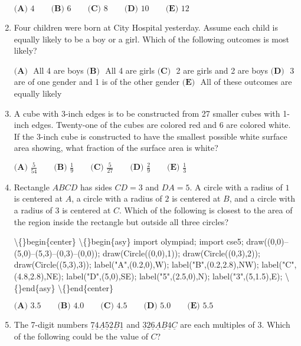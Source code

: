 \documentclass{article}
\begin{document}
\begin{enumerate}[label=\arabic*., itemsep=0.5em]
\( \textbf{(A) }4\qquad\textbf{(B) }6\qquad\textbf{(C) }8\qquad\textbf{(D) }10\qquad\textbf{(E) }12 \)\par \vspace{0.5em}\item Four children were born at City Hospital yesterday. Assume each child is equally likely to be a boy or a girl. Which of the following outcomes is most likely?

\(\textbf{(A) } \) All 4 are boys   \(\textbf{(B) } \) All 4 are girls    \(\textbf{(C) } \) 2 are girls and 2 are boys
\(\textbf{(D) } \) 3 are of one gender and 1 is of the other gender     \(\textbf{(E) } \) All of these outcomes are equally likely\par \vspace{0.5em}\item A cube with 3-inch edges is to be constructed from 27 smaller cubes with 1-inch edges. Twenty-one of the cubes are colored red and 6 are colored white. If the 3-inch cube is constructed to have the smallest possible white surface area showing, what fraction of the surface area is white?

\( \textbf{(A) }\frac{5}{54}\qquad\textbf{(B) }\frac{1}{9}\qquad\textbf{(C) }\frac{5}{27}\qquad\textbf{(D) }\frac{2}{9}\qquad\textbf{(E) }\frac{1}{3} \)\par \vspace{0.5em}\item Rectangle \(ABCD\) has sides \(CD=3\) and \(DA=5\). A circle with a radius of \(1\) is centered at \(A\), a circle with a radius of \(2\) is centered at \(B\), and a circle with a radius of \(3\) is centered at \(C\). Which of the following is closest to the area of the region inside the rectangle but outside all three circles?

\textbackslash\{\}begin\{center\}
\textbackslash\{\}begin\{asy\}
import olympiad;
import cse5;
draw((0,0)--(5,0)--(5,3)--(0,3)--(0,0));
draw(Circle((0,0),1));
draw(Circle((0,3),2));
draw(Circle((5,3),3));
label("A",(0.2,0),W);
label("B",(0.2,2.8),NW);
label("C",(4.8,2.8),NE);
label("D",(5,0),SE);
label("5",(2.5,0),N);
label("3",(5,1.5),E);
\textbackslash\{\}end\{asy\}
\textbackslash\{\}end\{center\}


\( \textbf{(A) }3.5\qquad\textbf{(B) }4.0\qquad\textbf{(C) }4.5\qquad\textbf{(D) }5.0\qquad\textbf{(E) }5.5 \)\par \vspace{0.5em}\item The 7-digit numbers \(\underline{7} \underline{4} \underline{A} \underline{5} \underline{2} \underline{B} \underline{1}\) and \(\underline{3} \underline{2} \underline{6} \underline{A} \underline{B} \underline{4} \underline{C}\) are each multiples of 3. Which of the following could be the value of \(C\)?


\end{enumerate}
\end{document}
